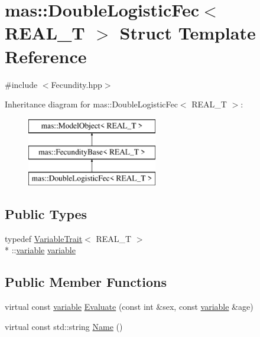 \hypertarget{structmas_1_1_double_logistic_fec}{\section{mas\-:\-:Double\-Logistic\-Fec$<$ R\-E\-A\-L\-\_\-\-T $>$ Struct Template Reference}
\label{structmas_1_1_double_logistic_fec}
}


{\ttfamily \#include $<$Fecundity.\-hpp$>$}

Inheritance diagram for mas\-:\-:Double\-Logistic\-Fec$<$ R\-E\-A\-L\-\_\-\-T $>$\-:\begin{figure}[H]
\begin{center}
\leavevmode
\includegraphics[height=3.000000cm]{structmas_1_1_double_logistic_fec}
\end{center}
\end{figure}
\subsection*{Public Types}
\begin{DoxyCompactItemize}
\item 
typedef \hyperlink{structmas_1_1_variable_trait}{Variable\-Trait}$<$ R\-E\-A\-L\-\_\-\-T $>$\\*
\-::\hyperlink{structmas_1_1_double_logistic_fec_abfb3cdee2e273df6dbffdb71bba6ab9c}{variable} \hyperlink{structmas_1_1_double_logistic_fec_abfb3cdee2e273df6dbffdb71bba6ab9c}{variable}
\end{DoxyCompactItemize}
\subsection*{Public Member Functions}
\begin{DoxyCompactItemize}
\item 
virtual const \hyperlink{structmas_1_1_double_logistic_fec_abfb3cdee2e273df6dbffdb71bba6ab9c}{variable} \hyperlink{structmas_1_1_double_logistic_fec_a732cf8310636c612ed4a6cf78079e03b}{Evaluate} (const int \&sex, const \hyperlink{structmas_1_1_double_logistic_fec_abfb3cdee2e273df6dbffdb71bba6ab9c}{variable} \&age)
\item 
virtual const std\-::string \hyperlink{structmas_1_1_double_logistic_fec_a08517ef4ed14c1dc4e6fdce9baafbae0}{Name} ()
\end{DoxyCompactItemize}
